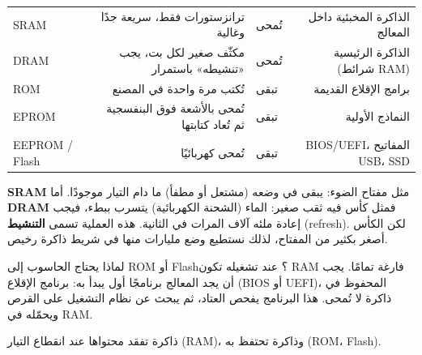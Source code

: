 \begin{center}
\small
\begin{tabularx}{\linewidth}{|>{\centering\arraybackslash}p{2.2cm}|R|>{\centering\arraybackslash}p{2.4cm}|R|}
    \hline
     &  &  &  \\ \hline
    \textenglish{SRAM} & ترانزستورات فقط، سريعة جدًا وغالية & تُمحى & الذاكرة المخبئية داخل المعالج \\ \hline
    \textenglish{DRAM} & مكثّف صغير لكل بت، يجب «تنشيطه» باستمرار & تُمحى & الذاكرة الرئيسية (شرائط \textenglish{RAM}) \\ \hline
    \textenglish{ROM}  & تُكتب مرة واحدة في المصنع & تبقى & برامج الإقلاع القديمة \\ \hline
    \textenglish{EPROM} & تُمحى بالأشعة فوق البنفسجية ثم تُعاد كتابتها & تبقى & النماذج الأولية \\ \hline
    \textenglish{EEPROM / Flash} & تُمحى كهربائيًا & تبقى & \textenglish{BIOS/UEFI}، المفاتيح \textenglish{USB}، \textenglish{SSD} \\ \hline
\end{tabularx}
\end{center}

\begin{tashbih}
    \textbf{\textenglish{SRAM}} مثل مفتاح الضوء: يبقى في وضعه (مشتعل أو مطفأ) ما دام التيار موجودًا.
    أما \textbf{\textenglish{DRAM}} فمثل كأس فيه ثقب صغير: الماء (الشحنة الكهربائية) يتسرب ببطء، فيجب إعادة ملئه
    آلاف المرات في الثانية. هذه العملية تسمى \textbf{التنشيط} \textenglish{(refresh)}. لكن الكأس أصغر بكثير من المفتاح،
    لذلك نستطيع وضع مليارات منها في شريط ذاكرة رخيص.
\end{tashbih}

\begin{hal}
    لماذا يحتاج الحاسوب إلى \textenglish{ROM} أو \textenglish{Flash}؟ عند تشغيله تكون \textenglish{RAM} فارغة تمامًا.
    يجب أن يجد المعالج برنامجًا أول يبدأ به: برنامج الإقلاع (\textenglish{BIOS} أو \textenglish{UEFI})، المحفوظ في
    ذاكرة لا تُمحى. هذا البرنامج يفحص العتاد، ثم يبحث عن نظام التشغيل على القرص ويحمّله في \textenglish{RAM}.
\end{hal}

\begin{tarif}
    ذاكرة  تفقد محتواها عند انقطاع التيار (\textenglish{RAM})،
    وذاكرة  تحتفظ به (\textenglish{ROM}، \textenglish{Flash}).
\end{tarif}

